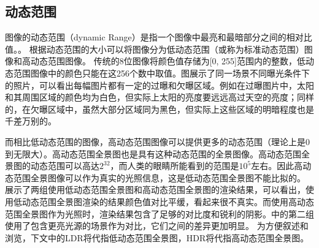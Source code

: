 \subsection{动态范围}
图像的动态范围（dynamic Range）是指一个图像中最亮和最暗部分之间的相对比值。\cite{wikipedia}。
根据动态范围的大小可以将图像分为低动态范围（或称为标准动态范围）图像和高动态范围图像。
传统的8位图像将颜色值存储为[0, 255]范围内的整数，低动态范围图像中的颜色只能在这256个数中取值。图展示了同一场景不同曝光条件下的照片，可以看出每幅图片都有一定的过曝和欠曝区域。例如在过曝图片中，太阳和其周围区域的颜色均为白色，但实际上太阳的亮度要远远高过天空的亮度；同样的，在欠曝区域中，虽然大部分区域同为黑色，但实际上这些区域的明暗程度也是千差万别的。

而相比低动态范围的图像，高动态范围图像可以提供更多的动态范围（理论上是0到无限大）。高动态范围全景图也是具有这种动态范围的全景图像。高动态范围全景图的动态范围可以高达$2^{32}$，而人类的眼睛所能看到的范围是$10^5$左右\cite{wikipedia}。因此高动态范围全景图像可以作为真实的光照信息，这是低动态范围全景图不能比拟的。
展示了两组使用低动态范围全景图和高动态范围全景图的渲染结果，可以看出，使用低动态范围全景图渲染的结果颜色值对比平缓，看起来很不真实。而使用高动态范围全景图作为光照时，渲染结果包含了足够的对比度和锐利的阴影。中的第二组使用了包含更亮光源的场景作为对比，它们之间的差异更加明显。
为方便叙述和浏览，下文中的LDR将代指低动态范围全景图，HDR将代指高动态范围全景图。

